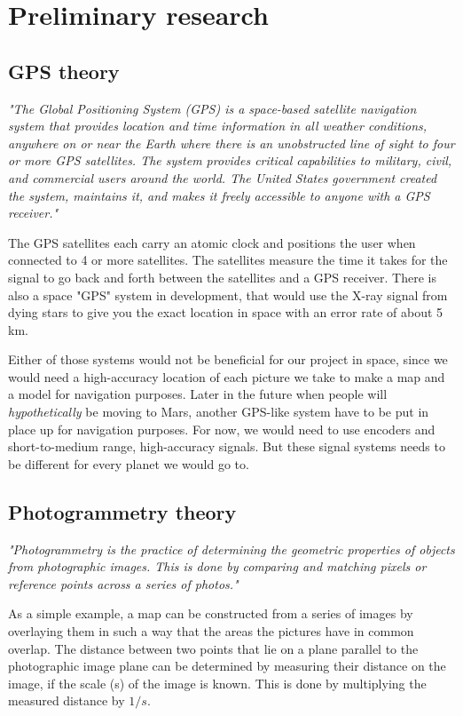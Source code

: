\clearpage
\section{Preliminary research}

\subsection{GPS theory}

\textit{"The Global Positioning System (GPS) is a space-based satellite navigation system that provides location and time information in all weather conditions, anywhere on or near the Earth where there is an unobstructed line of sight to four or more GPS satellites. The system provides critical capabilities to military, civil, and commercial users around the world. The United States government created the system, maintains it, and makes it freely accessible to anyone with a GPS receiver."\cite{GPS1}}

The GPS satellites each carry an atomic clock and positions the user when connected to 4 or more satellites. The satellites measure the time it takes for the signal to go back and forth between the satellites and a GPS receiver\cite{GPS1}. There is also a space "GPS" system in development, that would use the X-ray signal from dying stars to give you the exact location in space with an error rate of about 5 km\cite{GPS2}.

Either of those systems would not be beneficial for our project in space, since we would need a high-accuracy location of each picture we take to make a map and a model for navigation purposes. Later in the future when people will \textit{hypothetically} be moving to Mars, another GPS-like system have to be put in place up for navigation purposes. For now, we would need to use encoders and short-to-medium range, high-accuracy signals. But these signal systems needs to be different for every planet we would go to. 

\subsection{Photogrammetry theory}

\textit{"Photogrammetry is the practice of determining the geometric properties of objects from
	photographic images. This is done by comparing and matching pixels or reference points across a series
	of photos."\cite{Photogrammetry}}

As a simple example, a map can be constructed from a series of images by overlaying them in such a way that the areas the pictures have in common overlap. The distance between two points that lie on a plane parallel to the photographic image plane can be determined by measuring their distance on the image, if the scale (s) of the image is known. This is done by multiplying the measured distance by $1/s$\cite{photo}.

